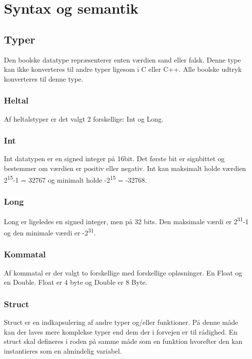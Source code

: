 \section{Syntax og semantik}\label{sec:Syntax}


\subsection{Typer}

Den boolske datatype repræsenterer enten værdien sand eller falsk. Denne type kan ikke konverteres til andre typer ligesom i C eller C++. Alle boolske udtryk konverteres til denne type.

\subsubsection{Heltal}
Af heltalstyper er det valgt 2 forskellige: Int og Long. 

\subsubsection{Int}
Int datatypen er en signed integer på 16bit. Det første bit er signbittet og bestemmer om værdien er positiv eller negativ. Int kan maksimalt holde værdien 2\textsuperscript{15}-1 = 32767 og minimalt holde -2\textsuperscript{15} = -32768.

\subsubsection{Long}
Long er ligeledes en signed integer, men på 32 bits. Den maksimale værdi er 2\textsuperscript{31}-1 og den minimale værdi er -2\textsuperscript{31}.

\subsubsection{Kommatal}
Af kommatal er der valgt to forskellige med forskellige opløsninger. En Float og en Double. Float er 4 byte og Double er 8 Byte.

\subsubsection{Struct}
Struct er en indkapsulering af andre typer og/eller funktioner. På denne måde kan der laves mere komplekse typer end dem der i forvejen er til rådighed. En struct skal defineres i roden på samme måde som en funktion hvorefter den kan instantieres som en almindelig variabel.

